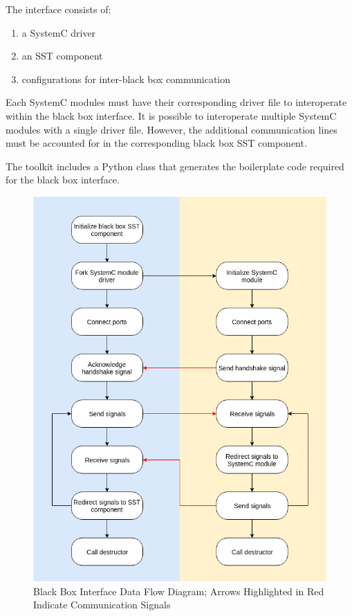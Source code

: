 \documentclass{article}
\begin{document}
  The interface consists of:
  \begin{enumerate}
    \item a SystemC driver
    \item an SST component
    \item configurations for inter-black box communication
  \end{enumerate}

  Each SystemC modules must have their corresponding driver file to interoperate within the black
  box interface. It is possible to interoperate multiple SystemC modules with a single driver
  file. However, the additional communication lines must be accounted for in the corresponding
  black box SST component.

  The toolkit includes a Python class that generates the boilerplate code required for the black
  box interface.

  \begin{figure}[!h]
    \centering
    \includegraphics[width=5in]{diagrams/data_flow.png}
    \caption{Black Box Interface Data Flow Diagram; Arrows Highlighted in Red Indicate
    Communication Signals}
    \label{fig:data_flow}
  \end{figure}
\end{document}
